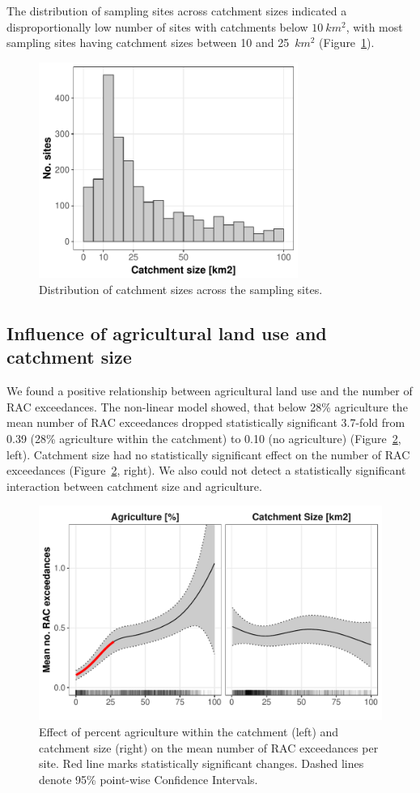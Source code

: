 \documentclass[journal=esthag,manuscript=article]{achemso}
\begin{document}
The distribution of sampling sites across catchment sizes indicated a disproportionally low number of sites with catchments below $10~km^2$, with
most sampling sites having catchment sizes between 10 and 25~$km^2$ (Figure~\ref{fig:fig3}). 


\begin{figure}[ht]
  \includegraphics[width=3.33in]{figure3.pdf}
  \caption{Distribution of catchment sizes across the sampling sites.}
  \label{fig:fig3}
\end{figure}


\subsection{Influence of agricultural land use and catchment size}
We found a positive relationship between agricultural land use and the number of RAC exceedances. 
The non-linear model showed, that below 28\% agriculture the mean number of RAC exceedances dropped statistically significant 3.7-fold from 0.39 (28\% agriculture within the catchment) to 0.10 (no agriculture) (Figure~\ref{fig:fig4}, left).
Catchment size had no statistically significant effect on the number of RAC exceedances (Figure~\ref{fig:fig4}, right).
We also could not detect a statistically significant interaction between catchment size and agriculture. 

\begin{figure}[ht]
  \includegraphics[width=6.5in]{figure4.pdf}
  \caption{Effect of percent agriculture within the catchment (left) and catchment size (right) on the mean number of RAC exceedances per site. Red line marks statistically significant changes. Dashed lines denote 95\% point-wise Confidence Intervals.
  }
  \label{fig:fig4}
\end{figure}
\end{document}
